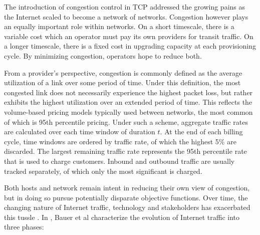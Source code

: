 The introduction of congestion control in \ac{TCP} addressed the growing pains as the Internet scaled to become a network of networks.
Congestion however plays an equally important role within networks.
On a short timescale, there is a variable cost which an operator must pay its own providers for transit traffic. 
On a longer timescale, there is a fixed cost in upgrading capacity at each provisioning cycle.
By minimizing congestion, operators hope to reduce both. 

From a provider's perspective, congestion is commonly defined as the average utilization of a link over some period of time. 
Under this definition, the most congested link does not necessarily experience the highest packet loss, but rather exhibits the highest utilization over an extended period of time.
This reflects the volume-based pricing models typically used between networks, the most common of which is 95th percentile pricing.
Under such a scheme, aggregate traffic rates are calculated over each time window of duration $t$.
At the end of each billing cycle, time windows are ordered by traffic rate, of which the highest 5\% are discarded.
The largest remaining traffic rate represents the 95th percentile rate that is used to charge customers.
Inbound and outbound traffic are usually tracked separately, of which only the most significant is charged.

Both hosts and network remain intent in reducing their own view of congestion, but in doing so pursue potentially disparate objective functions.
Over time, the changing nature of Internet traffic, technology and stakeholders has exacerbated this tussle \cite{Clark:2005p67}.
In \cite{Bauer:2009p200}, Bauer et al characterize the evolution of Internet traffic into three phases:

